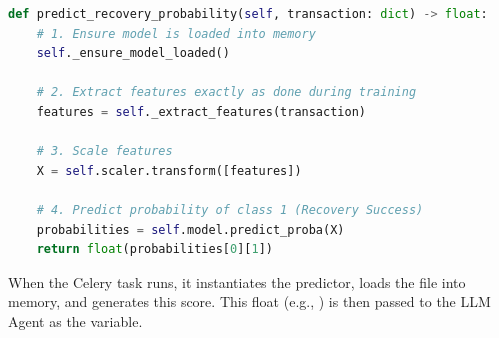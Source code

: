 \begin{tcolorbox}[codebox={Model Prediction Execution}]
\begin{lstlisting}[language=Python]
def predict_recovery_probability(self, transaction: dict) -> float:
    # 1. Ensure model is loaded into memory
    self._ensure_model_loaded()
    
    # 2. Extract features exactly as done during training
    features = self._extract_features(transaction)
    
    # 3. Scale features
    X = self.scaler.transform([features])
    
    # 4. Predict probability of class 1 (Recovery Success)
    probabilities = self.model.predict_proba(X)
    return float(probabilities[0][1])
\end{lstlisting}
\end{tcolorbox}

When the  Celery task runs, it instantiates the predictor, loads the  file into memory, and generates this score. This float (e.g., ) is then passed to the LLM Agent as the  variable.
